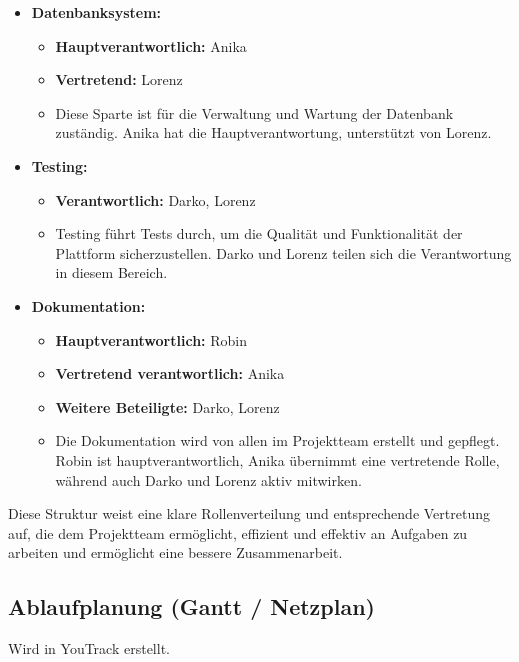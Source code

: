 \begin{itemize}
    \item \textbf{Datenbanksystem:}
    \begin{itemize}
        \item \textbf{Hauptverantwortlich:} Anika
        \item \textbf{Vertretend:} Lorenz
        \item Diese Sparte ist für die Verwaltung und Wartung der Datenbank zuständig.
        Anika hat die Hauptverantwortung, unterstützt von Lorenz.
    \end{itemize}

    \item \textbf{Testing:}
    \begin{itemize}
        \item \textbf{Verantwortlich:} Darko, Lorenz
        \item Testing führt Tests durch, um die Qualität und Funktionalität der Plattform sicherzustellen.
        Darko und Lorenz teilen sich die Verantwortung in diesem Bereich.
    \end{itemize}

    \item \textbf{Dokumentation:}
    \begin{itemize}
        \item \textbf{Hauptverantwortlich:} Robin
        \item \textbf{Vertretend verantwortlich:} Anika
        \item \textbf{Weitere Beteiligte:} Darko, Lorenz
        \item Die Dokumentation wird von allen im Projektteam erstellt und gepflegt.
        Robin ist hauptverantwortlich, Anika übernimmt eine vertretende Rolle, während auch Darko und Lorenz aktiv mitwirken.
    \end{itemize}
\end{itemize}


Diese Struktur weist eine klare Rollenverteilung und entsprechende Vertretung auf, die dem Projektteam ermöglicht, effizient und effektiv an Aufgaben zu arbeiten und ermöglicht eine bessere Zusammenarbeit.



\subsection{Ablaufplanung (Gantt / Netzplan)}\label{subsec:Ablaufplan}
Wird in YouTrack erstellt.

